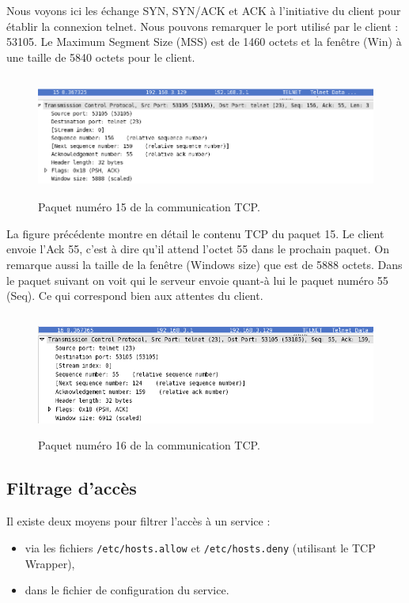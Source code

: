 \documentclass[12pt,a4paper,notitlepage]{article}
\begin{document}
Nous voyons ici les échange SYN, SYN/ACK et ACK à l'initiative du client pour établir la connexion telnet. Nous pouvons remarquer le port utilisé par le client : 53105.  Le Maximum Segment Size (MSS) est de 1460 octets et la fenêtre (Win) à une taille de 5840 octets pour le client.

\begin{figure}[!h]
\begin{center}
\includegraphics[height=4cm]{pck15.png}
\caption{Paquet numéro 15 de la communication TCP.}
\label{fig:do}
\end{center}
\end{figure}

La figure précédente montre en détail le contenu TCP du paquet 15. Le client envoie l'Ack 55, c'est à dire qu'il attend l'octet 55 dans le prochain paquet. On remarque aussi la taille de la fenêtre (\og Windows size\fg) que est de 5888 octets. Dans le paquet suivant on voit qui le serveur envoie quant-à lui le paquet numéro 55 (Seq). Ce qui correspond bien aux attentes du client.

\begin{figure}[!h]
\begin{center}
\includegraphics[height=4cm]{pck16.png}
\caption{Paquet numéro 16 de la communication TCP.}
\label{fig:do}
\end{center}
\end{figure}

\subsection{Filtrage d'accès}

Il existe deux moyens pour filtrer l'accès à un service : 
\begin{itemize}
\item via les fichiers \texttt{/etc/hosts.allow} et \texttt{/etc/hosts.deny} (utilisant le TCP Wrapper),
\item dans le fichier de configuration du service.
\end{itemize}
\end{document}
